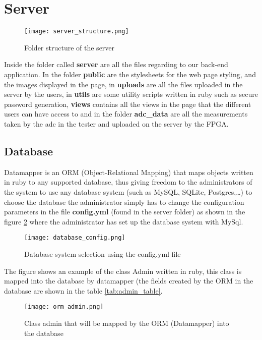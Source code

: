 \section{Server}

\begin{figure}[htb]
\centering
\texttt{[image: server\_structure.png]}
\caption{Folder structure of the server}
\label{fig:server_structure}
\end{figure}

  Inside the folder called {\bf server} are all the files regarding to our back-end application. In the folder {\bf public} are the stylesheets for the web page styling, and the images 
displayed in the page, in {\bf uploads} are all the files uploaded in the server by the users, in {\bf utils} are some utility scripts written in ruby such as secure password generation,
{\bf views} contains all the views in the page that the different users can have access to and in the folder {\bf adc\_data} are all the measurements taken by the adc in the tester and uploaded 
on the server by the FPGA.

\subsection{Database}

  Datamapper is an ORM (Object-Relational Mapping) that maps objects written in ruby to any supported database, thus giving freedom to the administrators of the system to use any database system (such as 
MySQL, SQLite, Postgres,\ldots) to choose the database the administrator simply has to change the configuration parameters in the file {\bf config.yml} (found in the server folder) as shown in the 
figure \ref{fig:database_config} where the administrator has set up the database system with MySql.

\begin{figure}[htb]
\centering
\texttt{[image: database\_config.png]}
\caption{Database system selection using the config.yml file}
\label{fig:database_config}
\end{figure}

The figure shows an example of the class Admin written in ruby, this class is mapped into the database by datamapper (the fields created by the ORM in the database are shown in the table \ref{tab:admin_table}.
\begin{figure}[htb]
\centering
\texttt{[image: orm\_admin.png]}
\caption{Class admin that will be mapped by the ORM (Datamapper) into the database}
\label{fig:admin_orm}
\end{figure}

